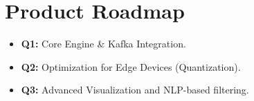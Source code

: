 \documentclass[
]{report}
\author{}
\date{}
\providecommand{\tightlist}{%
  \setlength{\itemsep}{0pt}\setlength{\parskip}{0pt}}
\begin{document}
\newcommand{\theProjectName}{NOAA}
\newcommand{\theAuthor}{Rodrigo Souza dos Santos}

\chapter{Product Roadmap}\label{product-roadmap}

\begin{itemize}
\tightlist
\item
  \textbf{Q1:} Core Engine \& Kafka Integration.
\item
  \textbf{Q2:} Optimization for Edge Devices (Quantization).
\item
  \textbf{Q3:} Advanced Visualization and NLP-based filtering.
\end{itemize}
\end{document}
